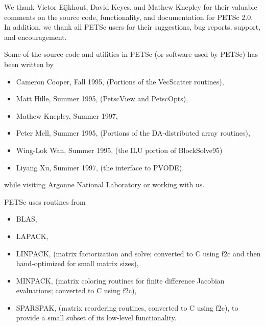 

\medskip \medskip 
We thank Victor Eijkhout, David Keyes, and Mathew Knepley for their valuable comments on the 
source code, functionality, and documentation  for PETSc 2.0.  
In addition, we thank all PETSc users for
their suggestions, bug reports, support, and encouragement.

\vspace{.3in}
Some of the source code and utilities in PETSc (or software used by PETSc)
has been written by 
\begin{itemize}
  \item Cameron Cooper, Fall 1995, (Portions of the VecScatter routines), 
  \item Matt Hille, Summer 1995, (PetscView and PetscOpts), 
  \item Mathew Knepley, Summer 1997,
  \item Peter Mell, Summer 1995, (Portions of the DA-distributed array routines),
  \item Wing-Lok Wan, Summer 1995, (the ILU portion of BlockSolve95)
  \item Liyang Xu, Summer 1997, (the interface to PVODE).
\end{itemize}
while visiting Argonne National Laboratory or working with us.

\vspace{.3in}
PETSc uses routines from 
\begin{itemize}
  \item BLAS, 
  \item LAPACK,
  \item LINPACK,      (matrix factorization and solve; converted to C using f2c and then 
                      hand-optimized for small matrix sizes),
  \item MINPACK,      (matrix coloring routines for finite difference Jacobian evaluations;
                      converted to C using f2c),
  \item SPARSPAK,     (matrix reordering routines, converted to C using f2c),
to provide a small subset of its low-level functionality.
\end{itemize}

